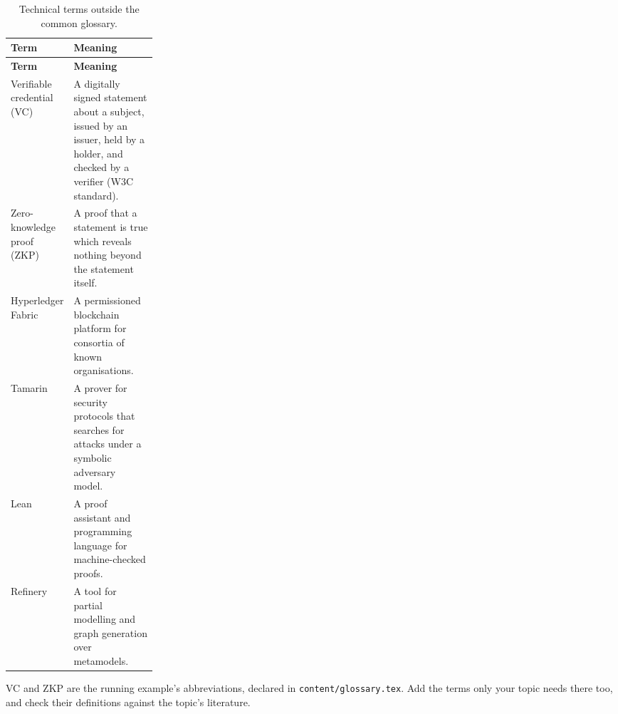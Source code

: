 {\small
\begin{xltabular}{\linewidth}{>{\raggedright\arraybackslash}p{0.24\linewidth} X}
  \caption{Technical terms outside the common glossary.}\label{tab:glossary-technical}\\
  \toprule \textbf{Term} & \textbf{Meaning} \\ \midrule \endfirsthead
  \toprule \textbf{Term} & \textbf{Meaning} \\ \midrule \endhead
  \bottomrule \endlastfoot
  Verifiable credential (VC) & A digitally signed statement about a subject, issued by an issuer, held by a holder, and checked by a verifier (W3C standard). \\
  Zero-knowledge proof (ZKP) & A proof that a statement is true which reveals nothing beyond the statement itself. \\
  Hyperledger Fabric & A permissioned blockchain platform for consortia of known organisations. \\
  Tamarin & A prover for security protocols that searches for attacks under a symbolic adversary model. \\
  Lean & A proof assistant and programming language for machine-checked proofs. \\
  Refinery & A tool for partial modelling and graph generation over metamodels. \\
\end{xltabular}
}
VC and ZKP are the running example's abbreviations, declared in \texttt{content/glossary.tex}. Add the terms only your topic needs there too, and check their definitions against the topic's literature.

